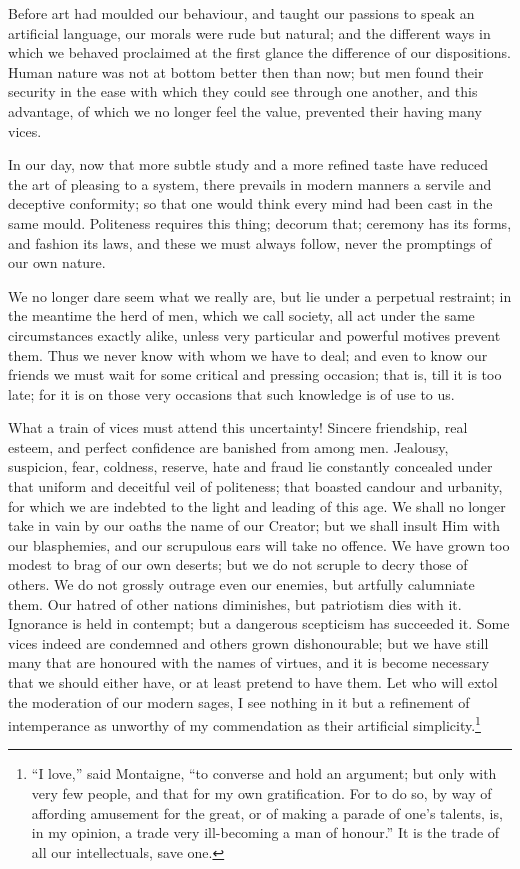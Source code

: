 Before art had moulded our behaviour, and taught our passions to speak
an artificial language, our morals were rude but natural; and the
different ways in which we behaved proclaimed at the first glance the
difference of our dispositions. Human nature was not at bottom better
then than now; but men found their security in the ease with which
they could see through one another, and this advantage, of which we no
longer feel the value, prevented their having many vices.

In our day, now that more subtle study and a more refined taste have
reduced the art of pleasing to a system, there prevails in modern
manners a servile and deceptive conformity; so that one would think
every mind had been cast in the same mould. Politeness requires this
thing; decorum that; ceremony has its forms, and fashion its laws, and
these we must always follow, never the promptings of our own nature.

We no longer dare seem what we really are, but lie under a perpetual
restraint; in the meantime the herd of men, which we call society, all
act under the same circumstances exactly alike, unless very particular
and powerful motives prevent them. Thus we never know with whom we
have to deal; and even to know our friends we must wait for some
critical and pressing occasion; that is, till it is too late; for it
is on those very occasions that such knowledge is of use to us.

What a train of vices must attend this uncertainty! Sincere
friendship, real esteem, and perfect confidence are banished from
among men. Jealousy, suspicion, fear, coldness, reserve, hate and
fraud lie constantly concealed under that uniform and deceitful veil
of politeness; that  boasted candour and urbanity, for which
we are indebted to the light and leading of this age. We shall no
longer take in vain by our oaths the name of our Creator; but we shall
insult Him with our blasphemies, and our scrupulous ears will take no
offence. We have grown too modest to brag of our own deserts; but we
do not scruple to decry those of others. We do not grossly outrage
even our enemies, but artfully calumniate them. Our hatred of other
nations diminishes, but patriotism dies with it. Ignorance is held in
contempt; but a dangerous scepticism has succeeded it. Some vices
indeed are condemned and others grown dishonourable; but we have still
many that are honoured with the names of virtues, and it is become
necessary that we should either have, or at least pretend to have
them. Let who will extol the moderation of our modern sages, I see
nothing in it but a refinement of intemperance as unworthy of my
commendation as their artificial simplicity.\footnote{``I love,'' said
Montaigne, ``to converse and hold an argument; but only with very few
people, and that for my own gratification. For to do so, by way of
affording amusement for the great, or of making a parade of one's
talents, is, in my opinion, a trade very ill-becoming a man of
honour.'' It is the trade of all our intellectuals, save one.}

